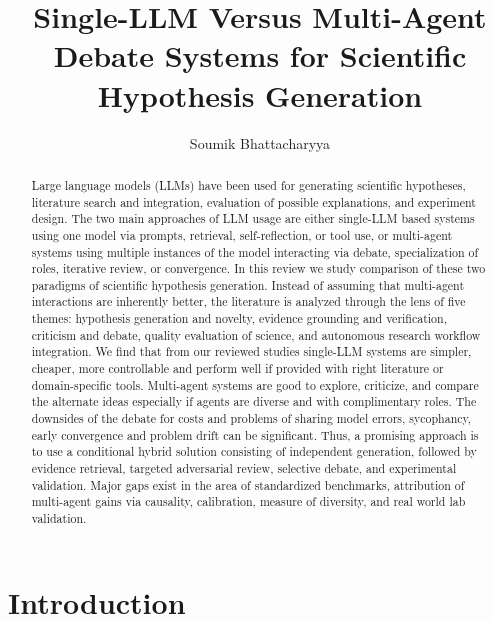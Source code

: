 \documentclass[acmsmall,screen,review]{acmart}
\title[Single-LLM Versus Multi-Agent Debate Systems]
  {Single-LLM Versus Multi-Agent Debate Systems for Scientific Hypothesis Generation}
\author{Soumik Bhattacharyya}
\affiliation{%
  \department{Department of Information Technology}
  \institution{Indian Institute of Information Technology Allahabad}
  \city{Prayagraj}
  \state{Uttar Pradesh}
  \country{India}
}
\begin{document}
\begin{abstract}
Large language models (LLMs) have been used for generating scientific hypotheses, literature search and integration, evaluation of possible explanations, and experiment design. The two main approaches of LLM usage are either single-LLM based systems using one model via prompts, retrieval, self-reflection, or tool use, or multi-agent systems using multiple instances of the model interacting via debate, specialization of roles, iterative review, or convergence. In this review we study comparison of these two paradigms of scientific hypothesis generation. Instead of assuming that multi-agent interactions are inherently better, the literature is analyzed through the lens of five themes: hypothesis generation and novelty, evidence grounding and verification, criticism and debate, quality evaluation of science, and autonomous research workflow integration. We find that from our reviewed studies single-LLM systems are simpler, cheaper, more controllable and perform well if provided with right literature or domain-specific tools. Multi-agent systems are good to explore, criticize, and compare the alternate ideas especially if agents are diverse and with complimentary roles. The downsides of the debate for costs and problems of sharing model errors, sycophancy, early convergence and problem drift can be significant. Thus, a promising approach is to use a conditional hybrid solution consisting of independent generation, followed by evidence retrieval, targeted adversarial review, selective debate, and experimental validation. Major gaps exist in the area of standardized benchmarks, attribution of multi-agent gains via causality, calibration, measure of diversity, and real world lab validation.

\end{abstract}


\maketitle

\section{Introduction}
\label{sec:introduction}
\end{document}
